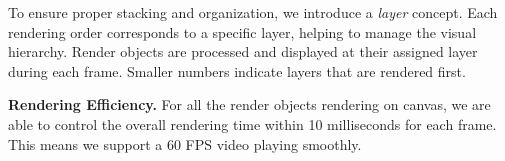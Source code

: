 To ensure proper stacking and organization, we introduce a \textit{layer} concept. Each rendering order corresponds to a specific layer, helping to manage the visual hierarchy. Render objects are processed and displayed at their assigned layer during each frame. Smaller numbers indicate layers that are rendered first.

\vspace{1mm}
\noindent\textbf{Rendering Efficiency.}
For all the render objects rendering on canvas, we are able to control the overall rendering time within 10 milliseconds for each frame. This means we support a 60 FPS video playing smoothly.






